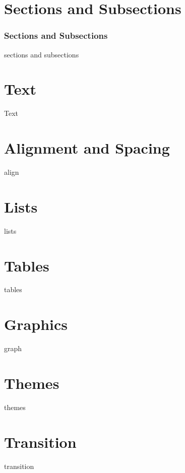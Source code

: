 \documentclass[aspectratio=169]{beamer}
\begin{document}
\section*{Sections and Subsections}
\begin{frame}
  \frametitle{Sections and Subsections}

  sections and subsections
\end{frame}

\section*{Text}
\begin{frame}
  Text
\end{frame}

\section*{Alignment and Spacing}
\begin{frame}
  align
\end{frame}

\section*{Lists}
\begin{frame}
  lists
\end{frame}

\section*{Tables}
\begin{frame}
  tables
\end{frame}

\section*{Graphics}
\begin{frame}
  graph
\end{frame}

\section*{Themes}
\begin{frame}
  themes
\end{frame}

\section*{Transition}
\begin{frame}
  transition
\end{frame}
\end{document}
